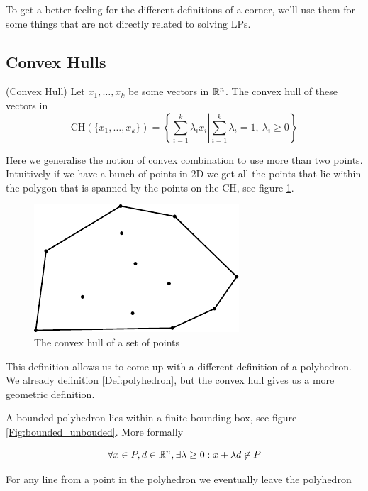 To get a better feeling for the different definitions of a corner, we'll use them for some things that are not directly related to solving LPs.

\subsection*{Convex Hulls}
\begin{Def}(Convex Hull) Let $x_1,\ldots,x_k$ be some vectors in $\mathbb{R}^n$. The convex hull of these vectors in
\[\mbox{CH}(\{x_1,\ldots,x_k\}) = \left\{\sum _{i=1}^k \lambda_i x_i \left| \sum_{i=1}^k \lambda_i =1,\ \lambda_i\geq 0\right.\right\}\]
\end{Def}

Here we generalise the notion of convex combination to use more than two points. Intuitively if we have a bunch of points in 2D we get all the points that lie within the polygon that is spanned by the points on the CH, see figure \ref{Fig:convexHull}.

\begin{figure}[hbt]
\begin{center}
\includegraphics{./images/convex_hull.pdf}
\end{center}
\caption{The convex hull of a set of points}
\label{Fig:convexHull}
\end{figure}

This definition allows us to come up with a different definition of a polyhedron. We already definition \ref{Def:polyhedron}, but the convex hull gives us a more geometric definition.

\begin{Def} A bounded polyhedron lies within a finite bounding box, see figure \ref{Fig:bounded_unbouded}. More formally

\[\forall x\in P,d\in \mathbb{R}^n, \exists \lambda\geq 0: x+\lambda d \not \in P\]

For any line from a point in the polyhedron we eventually leave the polyhedron
\end{Def}

